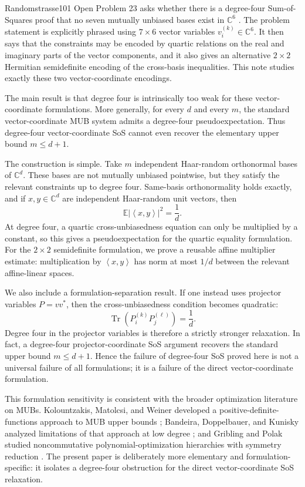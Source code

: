 \documentclass[11pt]{article}
\theoremstyle{remark}
\newcommand{\C}{\mathbb{C}}
\newcommand{\E}{\mathbb{E}}
\newcommand{\ip}[2]{\left\langle #1,#2\right\rangle}
\newcommand{\Tr}{\operatorname{Tr}}
\begin{document}
Randomstrasse101 Open Problem 23 asks whether there is a degree-four Sum-of-Squares proof that no seven mutually unbiased bases exist in $\C^6$ \cite{Randomstrasse2026}. The problem statement is explicitly phrased using $7\times 6$ vector variables $v_i^{(k)}\in\C^6$. It then says that the constraints may be encoded by quartic relations on the real and imaginary parts of the vector components, and it also gives an alternative $2\times2$ Hermitian semidefinite encoding of the cross-basis inequalities. This note studies exactly these two vector-coordinate encodings.

The main result is that degree four is intrinsically too weak for these vector-coordinate formulations. More generally, for every $d$ and every $m$, the standard vector-coordinate MUB system admits a degree-four pseudoexpectation. Thus degree-four vector-coordinate SoS cannot even recover the elementary upper bound $m\le d+1$.

The construction is simple. Take $m$ independent Haar-random orthonormal bases of $\C^d$. These bases are not mutually unbiased pointwise, but they satisfy the relevant constraints up to degree four. Same-basis orthonormality holds exactly, and if $x,y\in\C^d$ are independent Haar-random unit vectors, then
\[
\E |\ip{x}{y}|^2=\frac1d.
\]
At degree four, a quartic cross-unbiasedness equation can only be multiplied by a constant, so this gives a pseudoexpectation for the quartic equality formulation. For the $2\times2$ semidefinite formulation, we prove a reusable affine multiplier estimate: multiplication by $\ip{x}{y}$ has norm at most $1/d$ between the relevant affine-linear spaces.

We also include a formulation-separation result. If one instead uses projector variables $P=vv^*$, then the cross-unbiasedness condition becomes quadratic:
\[
\Tr(P_i^{(k)}P_j^{(\ell)})=\frac1d.
\]
Degree four in the projector variables is therefore a strictly stronger relaxation. In fact, a degree-four projector-coordinate SoS argument recovers the standard upper bound $m\le d+1$. Hence the failure of degree-four SoS proved here is not a universal failure of all formulations; it is a failure of the direct vector-coordinate formulation.

This formulation sensitivity is consistent with the broader optimization literature on MUBs. Kolountzakis, Matolcsi, and Weiner developed a positive-definite-functions approach to MUB upper bounds \cite{KMW2018}; Bandeira, Doppelbauer, and Kunisky analyzed limitations of that approach at low degree \cite{BDK2022}; and Gribling and Polak studied noncommutative polynomial-optimization hierarchies with symmetry reduction \cite{GriblingPolak2024}. The present paper is deliberately more elementary and formulation-specific: it isolates a degree-four obstruction for the direct vector-coordinate SoS relaxation.
\end{document}
